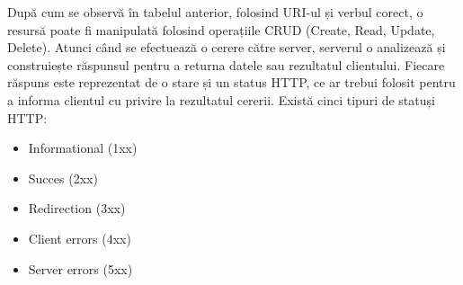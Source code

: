 După cum se observă în tabelul anterior, folosind URI-ul și verbul corect, o resursă poate fi manipulată folosind operațiile CRUD (Create, Read, Update, Delete).
Atunci când se efectuează o cerere către server, serverul o analizează și construiește răspunsul pentru a returna datele sau rezultatul clientului. Fiecare răspuns este reprezentat de o stare și un status HTTP, ce ar trebui folosit pentru a informa clientul cu privire la rezultatul cererii.
Există cinci tipuri de statuși HTTP:
\begin{itemize}
	\item Informational (1xx)
	\item Succes (2xx)
	\item Redirection (3xx)
	\item Client errors (4xx)
	\item Server errors (5xx)
\end{itemize}


